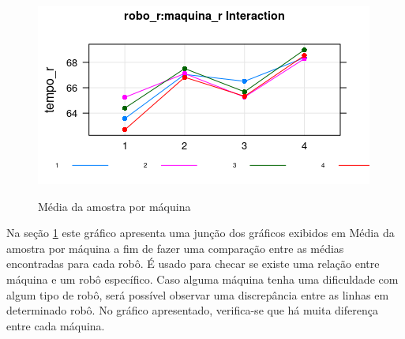 \documentclass[
12pt,					%
openright,				%
oneside,				%
a4paper,				%
english,
brazil
]{ABNT/abntex2_report}
\begin{document}
\begin{figure}[H]
	\centering
	\caption{Média da amostra por máquina}
	\includegraphics[scale = 1]{figures/graf6.png}
	\label{fig:graf6}
\end{figure}

Na seção \ref{fig:graf6} este gráfico apresenta uma junção dos gráficos exibidos em Média da amostra por máquina a fim de fazer uma comparação entre as médias encontradas para cada robô. É usado para checar se existe uma relação entre máquina e um robô específico. Caso alguma máquina tenha uma dificuldade com algum tipo de robô, será possível observar uma discrepância entre as linhas em determinado robô. No gráfico apresentado, verifica-se que há muita diferença entre cada máquina.






	\cleardoublepage
	\titleformat{\chapter}[display]{\vspace*{-24pt}\ABNTEXchapterfont\large\bfseries}{\chaptertitlename\ \thechapter}{12pt}{\Large}
	
\end{document}
